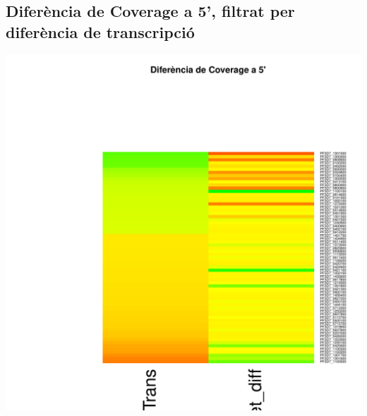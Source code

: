 \documentclass{article}\usepackage[]{graphicx}\usepackage[]{color}
\newenvironment{knitrout}{}{} %
\begin{document}
\subsection{Diferència de Coverage a 5', filtrat per diferència de transcripció}
\begin{knitrout}
\color{fgcolor}

{\centering \includegraphics[width=.9\linewidth]{figure/minimal-_heat_cov_diff_5-1} 

}



\end{knitrout}
\clearpage
\end{document}
